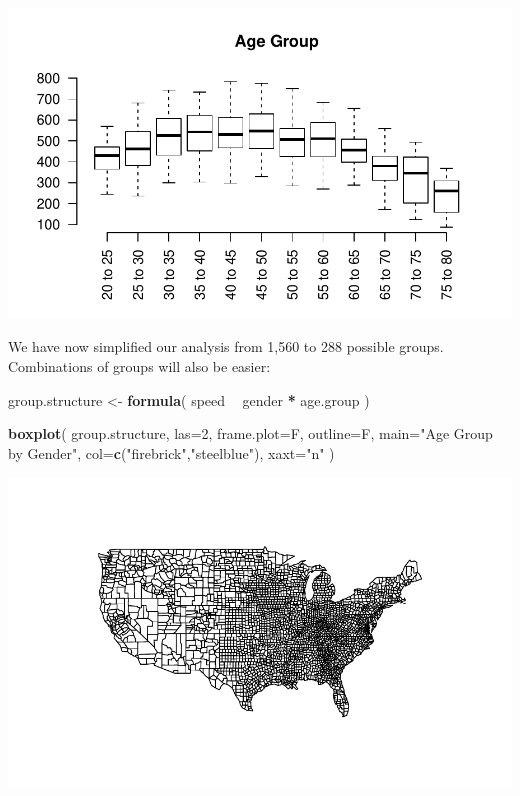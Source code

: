 \documentclass[]{book}
\newenvironment{Shaded}{\begin{snugshade}}{\end{snugshade}}
\newcommand{\DataTypeTok}[1]{\textcolor[rgb]{0.13,0.29,0.53}{#1}}
\newcommand{\DecValTok}[1]{\textcolor[rgb]{0.00,0.00,0.81}{#1}}
\newcommand{\KeywordTok}[1]{\textcolor[rgb]{0.13,0.29,0.53}{\textbf{#1}}}
\newcommand{\NormalTok}[1]{#1}
\newcommand{\OperatorTok}[1]{\textcolor[rgb]{0.81,0.36,0.00}{\textbf{#1}}}
\newcommand{\StringTok}[1]{\textcolor[rgb]{0.31,0.60,0.02}{#1}}
\theoremstyle{definition}
\theoremstyle{definition}
\theoremstyle{definition}
\theoremstyle{remark}
\begin{document}
\begin{center}\includegraphics[width=0.7\linewidth]{DS4PS-I_files/figure-latex/unnamed-chunk-143-1} \end{center}

We have now simplified our analysis from 1,560 to 288 possible groups.
Combinations of groups will also be easier:

\begin{Shaded}
\begin{Highlighting}[]

\NormalTok{group.structure <-}\StringTok{ }\KeywordTok{formula}\NormalTok{( speed }\OperatorTok{~}\StringTok{ }\NormalTok{gender }\OperatorTok{*}\StringTok{ }\NormalTok{age.group )}

\KeywordTok{boxplot}\NormalTok{( group.structure, }
         \DataTypeTok{las=}\DecValTok{2}\NormalTok{, }\DataTypeTok{frame.plot=}\NormalTok{F, }\DataTypeTok{outline=}\NormalTok{F, }\DataTypeTok{main=}\StringTok{"Age Group by Gender"}\NormalTok{,}
         \DataTypeTok{col=}\KeywordTok{c}\NormalTok{(}\StringTok{"firebrick"}\NormalTok{,}\StringTok{"steelblue"}\NormalTok{), }\DataTypeTok{xaxt=}\StringTok{"n"}\NormalTok{ )}
\end{Highlighting}
\end{Shaded}

\begin{center}\includegraphics[width=0.7\linewidth]{DS4PS-I_files/figure-latex/unnamed-chunk-144-1} \end{center}
\end{document}
